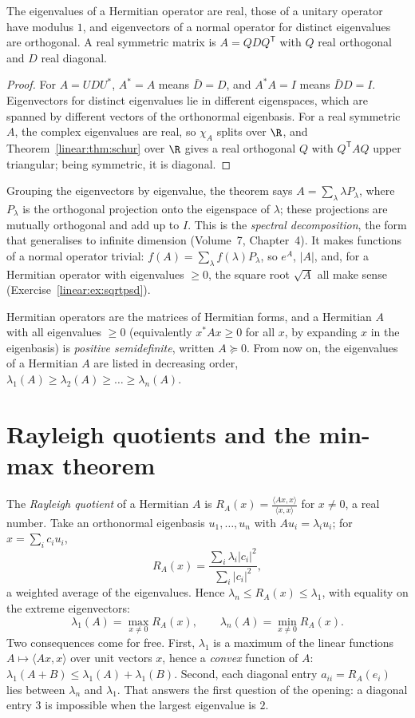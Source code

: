 \begin{corollary}\label{linear:cor:hermitian}
The eigenvalues of a Hermitian operator are real, those of a unitary operator have modulus $1$, and eigenvectors of a
normal operator for distinct eigenvalues are orthogonal. A real symmetric matrix is $A=QDQ^{\mathsf T}$ with $Q$ real
orthogonal and $D$ real diagonal.
\end{corollary}
\begin{proof}
For $A=UDU^*$, $A^*=A$ means $\bar D=D$, and $A^*A=I$ means $\bar DD=I$. Eigenvectors for distinct eigenvalues lie in
different eigenspaces, which are spanned by different vectors of the orthonormal eigenbasis. For a real symmetric $A$, the
complex eigenvalues are real, so $\chi_A$ splits over $\R$, and Theorem~\ref{linear:thm:schur} over $\R$ gives a real orthogonal
$Q$ with $Q^{\mathsf T}AQ$ upper triangular; being symmetric, it is diagonal.
\end{proof}

Grouping the eigenvectors by eigenvalue, the theorem says $A=\sum_\lambda\lambda P_\lambda$, where $P_\lambda$ is the
orthogonal projection onto the eigenspace of $\lambda$; these projections are mutually orthogonal and add up to $I$. This is
the \emph{spectral decomposition}, the form that generalises to infinite dimension (Volume~7, Chapter~4). It makes functions
of a normal operator trivial: $f(A)=\sum_\lambda f(\lambda)P_\lambda$, so $e^A$, $|A|$, and, for a Hermitian operator with
eigenvalues $\ge0$, the square root $\sqrt A$ all make sense (Exercise~\ref{linear:ex:sqrtpsd}).

Hermitian operators are the matrices of Hermitian forms, and a Hermitian $A$ with all eigenvalues $\ge0$ (equivalently
$x^*Ax\ge0$ for all $x$, by expanding $x$ in the eigenbasis) is \emph{positive semidefinite}, written $A\succeq0$. From now
on, the eigenvalues of a Hermitian $A$ are listed in decreasing order, $\lambda_1(A)\ge\lambda_2(A)\ge\dots\ge\lambda_n(A)$.

\section{Rayleigh quotients and the min-max theorem}

The \emph{Rayleigh quotient} of a Hermitian $A$ is $R_A(x)=\frac{\langle Ax,x\rangle}{\langle x,x\rangle}$ for $x\ne0$, a real
number. Take an orthonormal eigenbasis $u_1,\dots,u_n$ with $Au_i=\lambda_iu_i$; for $x=\sum_ic_iu_i$,
\begin{equation}\label{linear:eq:rayleigh}
R_A(x)=\frac{\sum_i\lambda_i|c_i|^2}{\sum_i|c_i|^2},
\end{equation}
a weighted average of the eigenvalues. Hence $\lambda_n\le R_A(x)\le\lambda_1$, with equality on the extreme eigenvectors:
\[
\lambda_1(A)=\max_{x\ne0}R_A(x),\qquad\lambda_n(A)=\min_{x\ne0}R_A(x).
\]
Two consequences come for free. First, $\lambda_1$ is a maximum of the linear functions $A\mapsto\langle Ax,x\rangle$ over unit
vectors $x$, hence a \emph{convex} function of $A$: $\lambda_1(A+B)\le\lambda_1(A)+\lambda_1(B)$. Second, each diagonal entry
$a_{ii}=R_A(e_i)$ lies between $\lambda_n$ and $\lambda_1$. That answers the first question of the opening: a diagonal entry
$3$ is impossible when the largest eigenvalue is $2$.

